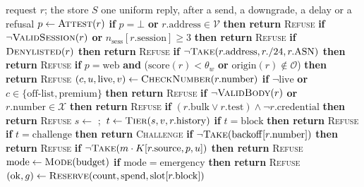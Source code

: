 \begin{algorithmic}[1]
\REQUIRE request $r$; the store $S$
\ENSURE one uniform reply, after a send, a downgrade, a delay or a refusal
\STATE $p \gets \textsc{Attest}(r)$
\STATE \textbf{if} $p = \bot$ \textbf{or} $r.\mathrm{address} \in \mathcal{V}$ \textbf{then return} \textsc{Refuse}
\STATE \textbf{if} $\neg\textsc{ValidSession}(r)$ \textbf{or} $n_{\mathrm{sess}}[r.\mathrm{session}] \ge 3$ \textbf{then return} \textsc{Refuse}
\STATE \textbf{if} $\textsc{Denylisted}(r)$ \textbf{then return} \textsc{Refuse}
\STATE \textbf{if} $\neg\textsc{Take}(r.\mathrm{address}, r.\mathrm{/24}, r.\mathrm{ASN})$ \textbf{then return} \textsc{Refuse}
\STATE \textbf{if} $p = \mathrm{web}$ \textbf{and} ($\mathrm{score}(r) < \theta_w$ \textbf{or} $\mathrm{origin}(r) \notin \mathcal{O}$) \textbf{then return} \textsc{Refuse}
\STATE $(c, u, \mathrm{live}, v) \gets \textsc{CheckNumber}(r.\mathrm{number})$
\STATE \textbf{if} $\neg\mathrm{live}$ \textbf{or} $c \in \{\text{off-list}, \text{premium}\}$ \textbf{then return} \textsc{Refuse}
\STATE \textbf{if} $\neg\textsc{ValidBody}(r)$ \textbf{or} $r.\mathrm{number} \in \mathcal{X}$ \textbf{then return} \textsc{Refuse}
\STATE \textbf{if} $(r.\mathrm{bulk} \lor r.\mathrm{test}) \land \neg r.\mathrm{credential}$ \textbf{then return} \textsc{Refuse}
\STATE $s \gets$ \scoreeq;\ $t \gets \textsc{Tier}(s, v, r.\mathrm{history})$
\STATE \textbf{if} $t = \mathrm{block}$ \textbf{then return} \textsc{Refuse}
\STATE \textbf{if} $t = \mathrm{challenge}$ \textbf{then return} \textsc{Challenge}
\STATE \textbf{if} $\neg\textsc{Take}(\mathrm{backoff}[r.\mathrm{number}])$ \textbf{then return} \textsc{Refuse}
\STATE \textbf{if} $\neg\textsc{Take}(m \cdot K[r.\mathrm{source}, p, u])$ \textbf{then return} \textsc{Refuse}
\STATE $\mathrm{mode} \gets \textsc{Mode}(\mathrm{budget})$
\STATE \textbf{if} $\mathrm{mode} = \mathrm{emergency}$ \textbf{then return} \textsc{Refuse}
\STATE $(\mathrm{ok}, g) \gets \textsc{Reserve}(\mathrm{count}, \mathrm{spend}, \mathrm{slot}[r.\mathrm{block}])$

\end{algorithmic}
